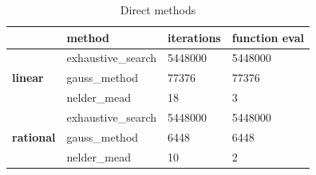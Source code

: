 \begin{table}[ht]
\caption{Direct methods}
\begin{tabular}{l|l|l|l|}
\cline{2-4}
                                                & \textbf{method}             & \textbf{iterations} & \textbf{function eval} \\ \hline
\multicolumn{1}{|l|}{\multirow{3}{*}{\textbf{linear}}}   & exhaustive\_search & 5448000  & 5448000     \\ \cline{2-4}
\multicolumn{1}{|l|}{}                          & gauss\_method      & 77376     & 77376        \\ \cline{2-4}
\multicolumn{1}{|l|}{}                          & nelder\_mead       & 18         & 3             \\ \hline
\multicolumn{1}{|l|}{\multirow{3}{*}{\textbf{rational}}} & exhaustive\_search & 5448000  & 5448000     \\ \cline{2-4}
\multicolumn{1}{|l|}{}                          & gauss\_method      & 6448      & 6448         \\ \cline{2-4}
\multicolumn{1}{|l|}{}                          & nelder\_mead       & 10         & 2             \\ \hline
\end{tabular}
\label{tbl:direct}
\end{table}

